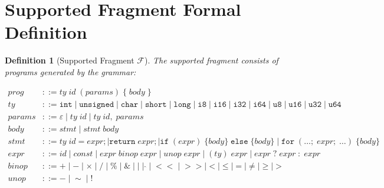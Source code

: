 \documentclass[11pt]{article}
\newtheorem{definition}[theorem]{Definition}
\begin{document}
\section{Supported Fragment Formal Definition}\label{app:fragment}

\begin{definition}[Supported Fragment $\mathcal{F}$]\label{def:fragment}
The supported fragment consists of programs generated by the grammar:

\begin{align*}
\mathit{prog}  &::= \mathit{ty}\;\mathit{id}\;(\mathit{params})\;\{\;\mathit{body}\;\} \\
\mathit{ty}    &::= \texttt{int} \mid \texttt{unsigned} \mid \texttt{char}
                     \mid \texttt{short} \mid \texttt{long}
                     \mid \texttt{i8} \mid \texttt{i16} \mid \texttt{i32}
                     \mid \texttt{i64}
                     \mid \texttt{u8} \mid \texttt{u16} \mid \texttt{u32}
                     \mid \texttt{u64} \\
\mathit{params} &::= \varepsilon \mid \mathit{ty}\;\mathit{id}
                      \mid \mathit{ty}\;\mathit{id},\;\mathit{params} \\
\mathit{body}  &::= \mathit{stmt} \mid \mathit{stmt}\;\mathit{body} \\
\mathit{stmt}  &::= \mathit{ty}\;\mathit{id} = \mathit{expr};
                     \mid \texttt{return}\;\mathit{expr};
                     \mid \texttt{if}\;(\mathit{expr})\;\{\mathit{body}\}
                       \;\texttt{else}\;\{\mathit{body}\}
                     \mid \texttt{for}\;(\ldots;\;\mathit{expr};\;\ldots)
                       \;\{\mathit{body}\} \\
\mathit{expr}  &::= \mathit{id} \mid \mathit{const}
                     \mid \mathit{expr}\;\mathit{binop}\;\mathit{expr}
                     \mid \mathit{unop}\;\mathit{expr}
                     \mid (\mathit{ty})\;\mathit{expr}
                     \mid \mathit{expr}\;?\;\mathit{expr}\;:\;\mathit{expr} \\
\mathit{binop} &::= + \mid - \mid \times \mid / \mid \%
                     \mid \mathtt{\&} \mid \mathtt{|} \mid \mathtt{\hat{}}
                     \mid \mathtt{<<} \mid \mathtt{>>}
                     \mid < \mid \leq \mid = \mid \neq \mid \geq \mid > \\
\mathit{unop}  &::= - \mid \mathtt{\sim} \mid \mathtt{!}
\end{align*}
\end{definition}
\end{document}
